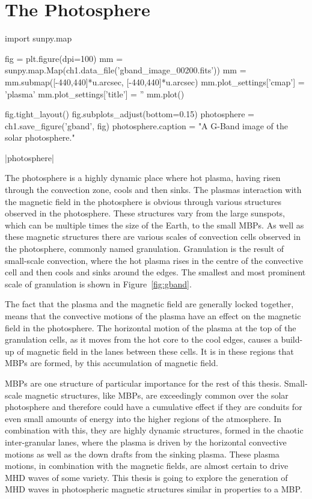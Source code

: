 \section{The Photosphere} 

\begin{pycode}[chapter1]
import sunpy.map

fig = plt.figure(dpi=100)
mm = sunpy.map.Map(ch1.data_file('gband_image_00200.fits'))
mm = mm.submap([-440,440]*u.arcsec, [-440,440]*u.arcsec)
mm.plot_settings['cmap'] = 'plasma'
mm.plot_settings['title'] = ''
mm.plot()

fig.tight_layout()
fig.subplots_adjust(bottom=0.15)
photosphere = ch1.save_figure('gband', fig)
photosphere.caption = "A G-Band image of the solar photosphere."
\end{pycode}

\py[chapter1]|photosphere|

The photosphere is a highly dynamic place where hot plasma, having risen through the convection zone, cools and then sinks.
The plasmas interaction with the magnetic field in the photosphere is obvious through various structures observed in the photosphere.
These structures vary from the large sunspots, which can be multiple times the size of the Earth, to the small MBPs. %
As well as these magnetic structures there are various scales of convection cells observed in the photosphere, commonly named granulation.
Granulation is the result of small-scale convection, where the hot plasma rises in the centre of the convective cell and then cools and sinks around the edges.
The smallest and most prominent scale of granulation is shown in Figure~\ref{fig:gband}.

The fact that the plasma and the magnetic field are generally locked together, means that the convective motions of the plasma have an effect on the magnetic field in the photosphere.
The horizontal motion of the plasma at the top of the granulation cells, as it moves from the hot core to the cool edges, causes a build-up of magnetic field in the lanes between these cells.
It is in these regions that MBPs are formed, by this accumulation of magnetic field. \citep{shelyag2004,keys2013}

MBPs are one structure of particular importance for the rest of this thesis.
Small-scale magnetic structures, like MBPs, are exceedingly common over the solar photosphere and therefore could have a cumulative effect if they are conduits for even small amounts of energy into the higher regions of the atmosphere.
In combination with this, they are highly dynamic structures, formed in the chaotic inter-granular lanes, where the plasma is driven by the horizontal convective motions as well as the down drafts from the sinking plasma.
These plasma motions, in combination with the magnetic fields, are almost certain to drive MHD waves of some variety. 
This thesis is going to explore the generation of MHD waves in photospheric magnetic structures similar in properties to a MBP.


